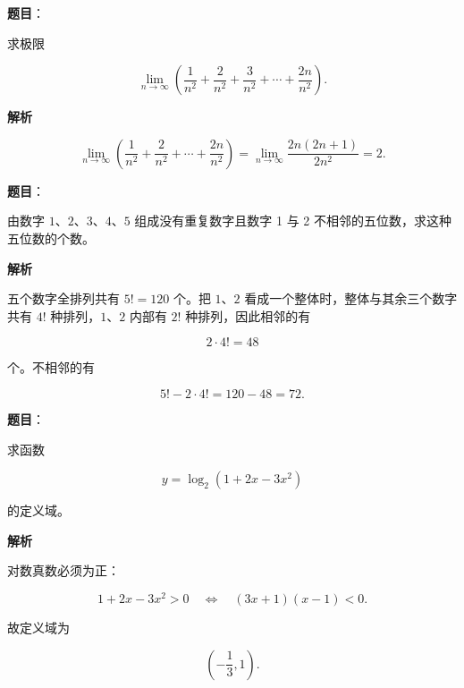 \begin{answer}

\textbf{题目}：

求极限

\nopagebreak[4]
\[
\lim_{n\to\infty}\left(\frac1{n^2}+\frac2{n^2}+\frac3{n^2}+\cdots+\frac{2n}{n^2}\right).
\]

\textbf{解析}

\nopagebreak[4]
\[
\lim_{n\to\infty}
\left(\frac1{n^2}+\frac2{n^2}+\cdots+\frac{2n}{n^2}\right)
=\lim_{n\to\infty}\frac{2n(2n+1)}{2n^2}=2.
\]


\end{answer}
\begin{answer}

\textbf{题目}：

由数字 $1\text{、}2\text{、}3\text{、}4\text{、}5$ 组成没有重复数字且数字 1 与 2 不相邻的五位数，求这种五位数的个数。

\textbf{解析}

五个数字全排列共有 $5!=120$ 个。把 $1\text{、}2$ 看成一个整体时，整体与其余三个数字共有 $4!$ 种排列，$1\text{、}2$ 内部有 $2!$ 种排列，因此相邻的有

\nopagebreak[4]
\[
2\cdot4!=48
\]

个。不相邻的有

\nopagebreak[4]
\[
5!-2\cdot4!=120-48=72.
\]


\end{answer}
\begin{answer}

\textbf{题目}：

求函数

\nopagebreak[4]
\[
y=\log_2(1+2x-3x^2)
\]

的定义域。

\textbf{解析}

对数真数必须为正：

\nopagebreak[4]
\[
1+2x-3x^2>0
\quad\Longleftrightarrow\quad
(3x+1)(x-1)<0.
\]

故定义域为

\nopagebreak[4]
\[
\left(-\frac13,1\right).
\]


\end{answer}
